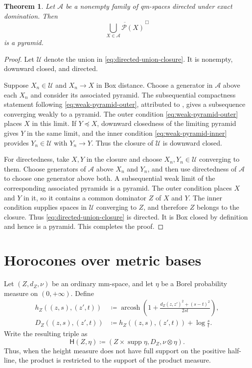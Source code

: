 \documentclass{amsart}
\numberwithin{equation}{section}
\theoremstyle{plain}
\newtheorem{theorem}{Theorem}[section]
\theoremstyle{definition}
\theoremstyle{remark}
\newcommand{\Pyr}{\mathcal P}
\DeclareMathOperator{\supp}{supp}
\DeclareMathOperator{\arcosh}{arcosh}
\begin{document}
\begin{theorem}\label{thm:directed-union-closure}
Let $\mathscr A$ be a nonempty family of qm-spaces directed under exact domination.  Then
\begin{equation}\label{eq:directed-union-closure} \overline{\bigcup_{X\in\mathscr A}\Pyr(X)}^{\,\Box} \end{equation}
is a pyramid.
\end{theorem}

\begin{proof}
Let $\mathcal U$ denote the union in \eqref{eq:directed-union-closure}.  It is nonempty, downward closed, and directed.

Suppose $X_n\in\mathcal U$ and $X_n\to X$ in Box distance.  Choose a generator in $\mathscr A$ above each $X_n$ and consider its associated pyramid.  The subsequential compactness statement following \eqref{eq:weak-pyramid-outer}, attributed to \cite[Corollary~5.3]{gds3-ja}, gives a subsequence converging weakly to a pyramid.  The outer condition \eqref{eq:weak-pyramid-outer} places $X$ in this limit.  If $Y\preceq X$, downward closedness of the limiting pyramid gives $Y$ in the same limit, and the inner condition \eqref{eq:weak-pyramid-inner} provides $Y_n\in\mathcal U$ with $Y_n\to Y$.  Thus the closure of $\mathcal U$ is downward closed.

For directedness, take $X,Y$ in the closure and choose $X_n,Y_n\in\mathcal U$ converging to them.  Choose generators of $\mathscr A$ above $X_n$ and $Y_n$, and then use directedness of $\mathscr A$ to choose one generator above both.  A subsequential weak limit of the corresponding associated pyramids is a pyramid.  The outer condition places $X$ and $Y$ in it, so it contains a common dominator $Z$ of $X$ and $Y$.  The inner condition supplies spaces in $\mathcal U$ converging to $Z$, and therefore $Z$ belongs to the closure.  Thus \eqref{eq:directed-union-closure} is directed.  It is Box closed by definition and hence is a pyramid.
	This completes the proof.
\end{proof}

\section{Horocones over metric bases}\label{app:horocones}

Let $(Z,d_Z,\nu)$ be an ordinary mm-space, and let $\eta$ be a Borel probability measure on $(0,+\infty)$.  Define
\begin{align}
 h_Z((z,s),(z',t))
 &\coloneqq\arcosh\left(1+\frac{d_Z(z,z')^2+(s-t)^2}{2st}\right),
 \label{eq:general-horocone-symmetric}\\
D_Z((z,s),(z',t)) &\coloneqq h_Z((z,s),(z',t))+\log\frac{s}{t}. \label{eq:general-horocone-directed}
\end{align}
Write the resulting triple as
\begin{equation}\label{eq:general-horocone-space}
 \mathsf H(Z,\eta)\coloneqq(Z\times\supp\eta,D_Z,\nu\otimes\eta).
\end{equation}
Thus, when the height measure does not have full support on the positive half-line, the product is restricted to the support
of the product measure.
\end{document}
